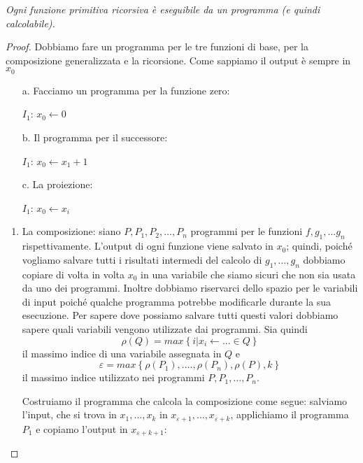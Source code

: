 \begin{thm}
\emph{Ogni funzione primitiva ricorsiva è eseguibile da un programma
(e quindi calcolabile).}\end{thm}
\begin{proof}
Dobbiamo fare un programma per le tre funzioni di base, per la
composizione generalizzata e la ricorsione. Come sappiamo il output è
sempre in $x_{0}$
\begin{itemize}
\item[a.] Facciamo un programma per la funzione zero:
\begin{mylisting}
$I_1$: $x_{0}\leftarrow0$
\end{mylisting}

\item[b.] Il programma per il successore:\begin{mylisting}$I_1$:
  $x_{0}\leftarrow x_{1}+1$\end{mylisting}

\item[c.] La proiezione:\begin{mylisting}$I_1$: $x_{0}\longleftarrow
  x_{i}$\end{mylisting}
\end{itemize}

\begin{enumerate}
\item La composizione: siano $P, P_1, P_2, \dots, P_n$ programmi per
  le funzioni $f,g_{1},...g_{n}$ rispettivamente. L'output di ogni
  funzione viene salvato in $x_{0}$; quindi, poich\'e vogliamo salvare
  tutti i risultati intermedi del calcolo di $g_{1},\dots,g_{n}$
  dobbiamo copiare di volta in volta $x_0$ in una variabile che siamo
  sicuri che non sia usata da uno dei programmi. Inoltre dobbiamo
  riservarci dello spazio per le variabili di input poich\'e qualche
  programma potrebbe modificarle durante la sua esecuzione.  Per
  sapere dove possiamo salvare tutti questi valori dobbiamo sapere
  quali variabili vengono utilizzate dai programmi.
  Sia quindi
  $$\rho(Q)=max\left\{ i|x_{i}\leftarrow...\in Q\right\}$$
  il massimo indice di una variabile assegnata in $Q$ e
  $$\varepsilon=max\left\{
  \rho(P_{1}),....,\rho(P_{n}),\rho(P),k\right\}$$
  il massimo indice utilizzato nei programmi $P, P_1, \dots, P_n$.

Costruiamo il programma che calcola la composizione come segue:
salviamo l'input, che si trova in $x_{1},\dots,x_{k}$ in
$x_{\varepsilon+1},\dots,x_{\varepsilon+k}$, applichiamo il programma
$P_1$ e copiamo l'output in $x_{\varepsilon+k+1}$:


\end{enumerate}
\end{proof}
